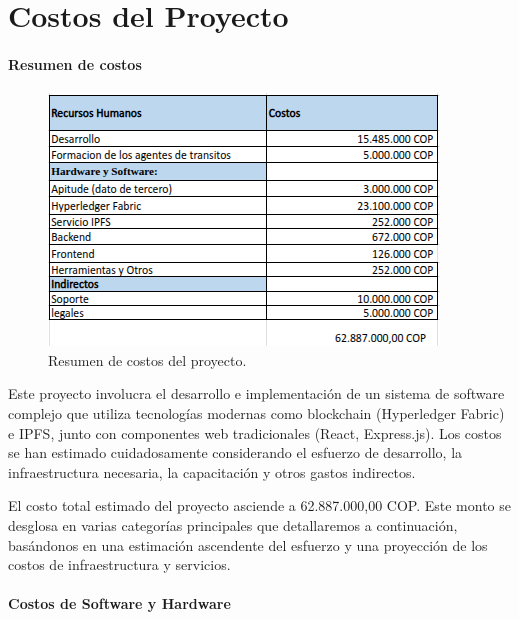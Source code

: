 \section{Costos del Proyecto}
\paragraph{Resumen de costos}

\begin{figure}[htbp]
    \centering
    \includegraphics[width=\textwidth]{Images/costos1.png}
    \caption{Resumen de costos del proyecto.}
    \label{fig:costos1}
\end{figure}

Este proyecto involucra el desarrollo e implementación de un sistema de software complejo que utiliza tecnologías modernas como blockchain (Hyperledger Fabric) e IPFS, junto con componentes web tradicionales (React, Express.js). Los costos se han estimado cuidadosamente considerando el esfuerzo de desarrollo, la infraestructura necesaria, la capacitación y otros gastos indirectos. 

El costo total estimado del proyecto asciende a 62.887.000,00 COP. Este monto se desglosa en varias categorías principales que detallaremos a continuación, basándonos en una estimación ascendente del esfuerzo y una proyección de los costos de infraestructura y servicios. 

\paragraph{Costos de Software y Hardware}

